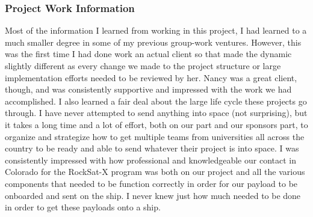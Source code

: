 \subsubsection{Project Work Information}
Most of the information I learned from working in this project, I had learned to a much smaller degree in some of my previous group-work
ventures. However, this was the first time I had done work an actual client so that made the dynamic slightly different as every change
we made to the project structure or large implementation efforts needed to be reviewed by her. Nancy was a great client, though, and
was consistently supportive and impressed with the work we had accomplished. I also learned a fair deal about the large life cycle
these projects go through. I have never attempted to send anything into space (not surprising), but it takes a long time and a lot of
effort, both on our part and our sponsors part, to organize and strategize how to get multiple teams from universities all across
the country to be ready and able to send whatever their project is into space. I was consistently impressed with how professional
and knowledgeable our contact in Colorado for the RockSat-X program was both on our project and all the various components
that needed to be function correctly in order for our payload to be onboarded and sent on the ship. I never knew just
how much needed to be done in order to get these payloads onto a ship.

